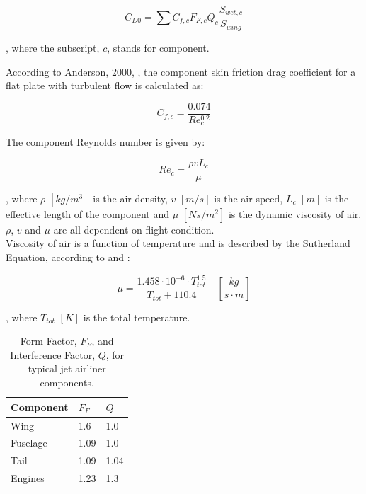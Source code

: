 \documentclass[english]{kththesis}
\begin{document}
\begin{equation}
\label{eq:CD0sum}
C_{D0} = \sum{C_{f,c} F_{F,c} Q_c \frac{S_{wet,c}}{S_{wing}}}
\end{equation}

, where the subscript, $c$, stands for component.

According to Anderson, 2000, \cite{Anderson2000}, the component skin friction drag coefficient for a flat plate with turbulent flow is calculated as:

\begin{equation}
\label{eq:Cfc}
C_{f,c} = \frac{0.074}{Re_c^{0.2}}
\end{equation}

The component Reynolds number is given by:

\begin{equation}
\label{eq:Rec}
Re_{c} = \frac{\rho v L_c}{\mu}
\end{equation}

, where $\rho$ $[kg/m^3]$ is the air density, $v$ $[m/s]$ is the air speed, $L_c$ $[m]$ is the effective length of the component and $\mu$ $[Ns/m^2]$ is the dynamic viscosity of air. $\rho$, $v$ and $\mu$ are all dependent on flight condition.\\

Viscosity of air is a function of temperature and is described by the Sutherland Equation, according to \cite{Sydney2005} and \cite{EngTool2003}:

\begin{equation}
\label{eq:mu}
\mu = \frac{1.458\cdot 10^{-6} \cdot T_{tot}^{1.5}}{T_{tot} + 110.4} \quad \left[ \frac{kg}{s\cdot m} \right]
\end{equation}

, where $T_{tot}$ $[K]$ is the total temperature.

\begin{table}[h!]
\centering
\caption{Form Factor, $F_F$, and Interference Factor, $Q$, for typical jet airliner components.}
\begin{tabular}{ l | l | l} 
Component & $F_F$ & $Q$\\
\hline
\hline
Wing & 1.6 & 1.0\\
Fuselage & 1.09 & 1.0\\
Tail & 1.09 & 1.04\\
Engines & 1.23 & 1.3\\
\end{tabular}
\label{table:DragFactors}
\end{table}
\end{document}
